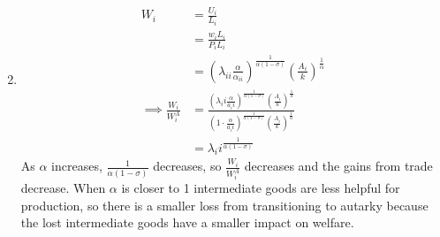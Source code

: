 \documentclass{article}
\begin{document}
\begin{enumerate}
\begin{enumerate}
\begin{align*}
    \end{align*}
    \end{enumerate}
    \item
    \begin{align*}
        W_i&= \frac{U_i}{L_i}\\
        &= \frac{w_i L_i}{P_i L_i}\\
        &= \left(\lambda_{ii} \frac{\alpha}{\alpha_{ii}}\right)^{\frac{1}{\alpha(1 - \sigma)}}\left(\frac{A_i}{k}\right)^{\frac{1}{\alpha}}\\
        \implies \frac{W_i}{W_i^A}&= \frac{\left(\lambda_ii \frac{\alpha}{a_ii}\right)^{\frac{1}{\alpha(1 - \sigma)}}\left(\frac{A_i}{k}\right)^{\frac{1}{\alpha}}}{\left(1 \cdot \frac{\alpha}{a_ii}\right)^{\frac{1}{\alpha(1 - \sigma)}} \left(\frac{A_i}{k}\right)^{\frac{1}{\alpha}}}\\
        &= \lambda_ii^{\frac{1}{\alpha (1 - \sigma)}}
    \end{align*}
    As $\alpha$ increases, $\frac{1}{\alpha(1 - \sigma)}$ decreases, so $\frac{W_i}{W_i^A}$ decreases and the gains from trade decrease. When $\alpha$ is closer to 1 intermediate goods are less helpful for production, so there is a smaller loss from transitioning to autarky because the lost intermediate goods have a smaller impact on welfare.
\end{enumerate}
\end{document}
